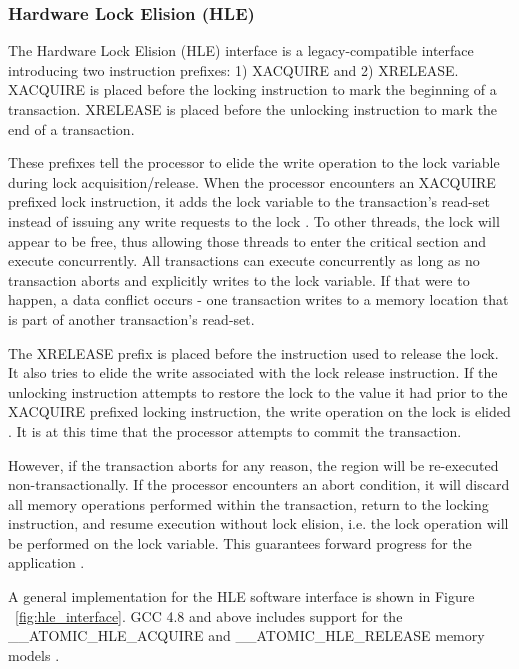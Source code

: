 \documentclass[a4paper]{article}
\begin{document}
\subsubsection{\textbf{Hardware Lock Elision (HLE)}}

\indent The Hardware Lock Elision (HLE) interface is a legacy-compatible
interface introducing two instruction prefixes: 1) XACQUIRE and 2) XRELEASE.
XACQUIRE is placed before the locking instruction to mark the beginning of a
transaction.  XRELEASE is placed before the unlocking instruction to mark the
end of a transaction.\par

\indent These prefixes tell the processor to elide the write operation to the
lock variable during lock acquisition/release.  When the processor encounters an
XACQUIRE prefixed lock instruction, it adds the lock variable to the
transaction's read-set instead of issuing any write requests to the lock
\cite{intel_prog_ref}.  To other threads, the lock will appear to be free, thus
allowing those threads to enter the critical section and execute concurrently.
All transactions can execute concurrently as long as no transaction aborts and
explicitly writes to the lock variable.  If that were to happen, a data conflict
occurs - one transaction writes to a memory location that is part of another
transaction's read-set.\par

\indent The XRELEASE prefix is placed before the instruction used to release the
lock.  It also tries to elide the write associated with the lock release
instruction.  If the unlocking instruction attempts to restore the lock to the
value it had prior to the XACQUIRE prefixed locking instruction, the write
operation on the lock is elided \cite{intel_prog_ref}.  It is at this time that
the processor attempts to commit the transaction.\par

\indent However, if the transaction aborts for any reason, the region will be
re-executed non-transactionally.  If the processor encounters an abort
condition, it will discard all memory operations performed within the
transaction, return to the locking instruction, and resume execution without
lock elision, i.e. the lock operation will be performed on the lock variable.
This guarantees forward progress for the application \cite{intel_prog_ref}.\par

\indent A general implementation for the HLE software interface is shown in
Figure ~\ref{fig:hle_interface}.  GCC 4.8 and above includes support for the
\_\_ATOMIC\_HLE\_ACQUIRE and \_\_ATOMIC\_HLE\_RELEASE memory models
\cite{gcc}.\par
\end{document}
